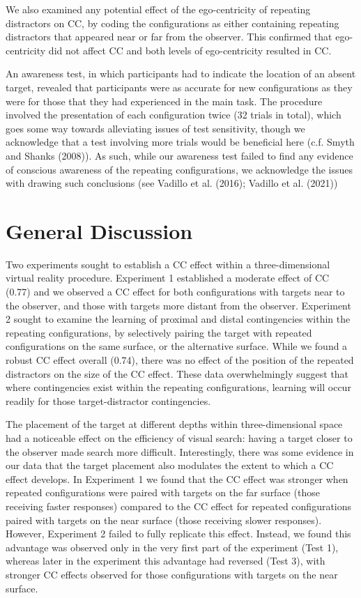 \documentclass[
  english,
  man,floatsintext]{apa7}
\begin{document}
We also examined any potential effect of the ego-centricity of repeating distractors on CC, by coding the configurations as either containing repeating distractors that appeared near or far from the observer. This confirmed that ego-centricity did not affect CC and both levels of ego-centricity resulted in CC.

An awareness test, in which participants had to indicate the location of an absent target, revealed that participants were as accurate for new configurations as they were for those that they had experienced in the main task. The procedure involved the presentation of each configuration twice (32 trials in total), which goes some way towards alleviating issues of test sensitivity, though we acknowledge that a test involving more trials would be beneficial here (c.f. Smyth and Shanks (2008)). As such, while our awareness test failed to find any evidence of conscious awareness of the repeating configurations, we acknowledge the issues with drawing such conclusions (see Vadillo et al. (2016); Vadillo et al. (2021))

\hypertarget{general-discussion}{%
\section{General Discussion}\label{general-discussion}}

Two experiments sought to establish a CC effect within a three-dimensional virtual reality procedure. Experiment 1 established a moderate effect of CC (0.77) and we observed a CC effect for both configurations with targets near to the observer, and those with targets more distant from the observer. Experiment 2 sought to examine the learning of proximal and distal contingencies within the repeating configurations, by selectively pairing the target with repeated configurations on the same surface, or the alternative surface. While we found a robust CC effect overall (0.74), there was no effect of the position of the repeated distractors on the size of the CC effect. These data overwhelmingly suggest that where contingencies exist within the repeating configurations, learning will occur readily for those target-distractor contingencies.

The placement of the target at different depths within three-dimensional space had a noticeable effect on the efficiency of visual search: having a target closer to the observer made search more difficult. Interestingly, there was some evidence in our data that the target placement also modulates the extent to which a CC effect develops. In Experiment 1 we found that the CC effect was stronger when repeated configurations were paired with targets on the far surface (those receiving faster responses) compared to the CC effect for repeated configurations paired with targets on the near surface (those receiving slower responses). However, Experiment 2 failed to fully replicate this effect. Instead, we found this advantage was observed only in the very first part of the experiment (Test 1), whereas later in the experiment this advantage had reversed (Test 3), with stronger CC effects observed for those configurations with targets on the near surface.
\end{document}
